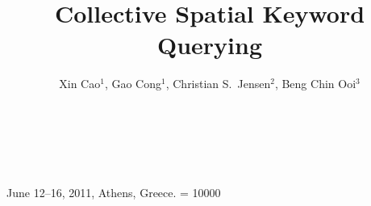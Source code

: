 \documentclass{sig-alternate}
\newcommand{\eat}[1]{}
\begin{document}
 {June 12--16, 2011, Athens, Greece.}
\widowpenalty = 10000
%

\title{Collective Spatial Keyword Querying}
%
%

\eat{
\numberofauthors{1}
\author{{Xin Cao$^1$  \hspace{0.5in} Gao Cong{$^1$} \hspace{0.5in} Christian S.~Jensen$^2$ \hspace{0.5in} Beng Chin Ooi$^3$}
\vspace{1.6mm}\\
$\;^1$\fontsize{11}{9}\selectfont School of Computer Engineering, Nanyang Technological University, Singapore\\
\fontsize{9}{9}\selectfont\ttfamily\upshape xcao1@e.ntu.edu.sg, gaocong@ntu.edu.sg
\vspace{1.2mm}\\
$\;^2$\fontsize{11}{9}\selectfont Department of Computer Science,
Aarhus University, Denmark\\
\fontsize{9}{9}\selectfont\ttfamily\upshape csj@cs.au.dk
\vspace{1.2mm}\\
$\;^3$\fontsize{10}{9}\selectfont School of Computing, National University of Singapore, Singapore\\
\fontsize{9}{9}\selectfont\ttfamily\upshape ooibc@comp.nus.edu.sg }
}

\author{\alignauthor Xin Cao$^1$,  Gao Cong$^1$, Christian S.~Jensen$^2$, Beng Chin Ooi$^3$\\
\\
\\
\\
}
\end{document}
